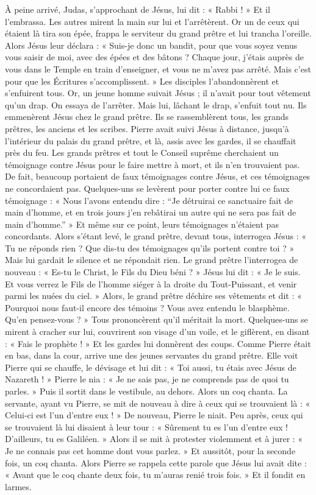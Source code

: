 À peine arrivé, Judas, s’approchant de Jésus, lui dit : « Rabbi ! » Et il l’embrassa.
Les autres mirent la main sur lui et l’arrêtèrent.
Or un de ceux qui étaient là tira son épée, frappa le serviteur du grand prêtre et lui trancha l’oreille.
Alors Jésus leur déclara : « Suis-je donc un bandit, pour que vous soyez venus vous saisir de moi, avec des épées et des bâtons ?
Chaque jour, j’étais auprès de vous dans le Temple en train d’enseigner, et vous ne m’avez pas arrêté. Mais c’est pour que les Écritures s’accomplissent. »
Les disciples l’abandonnèrent et s’enfuirent tous.
Or, un jeune homme suivait Jésus ; il n’avait pour tout vêtement qu’un drap. On essaya de l’arrêter.
Mais lui, lâchant le drap, s’enfuit tout nu.
Ils emmenèrent Jésus chez le grand prêtre. Ils se rassemblèrent tous, les grands prêtres, les anciens et les scribes.
Pierre avait suivi Jésus à distance, jusqu’à l’intérieur du palais du grand prêtre, et là, assis avec les gardes, il se chauffait près du feu.
Les grands prêtres et tout le Conseil suprême cherchaient un témoignage contre Jésus pour le faire mettre à mort, et ils n’en trouvaient pas.
De fait, beaucoup portaient de faux témoignages contre Jésus, et ces témoignages ne concordaient pas.
Quelques-uns se levèrent pour porter contre lui ce faux témoignage :
« Nous l’avons entendu dire : “Je détruirai ce sanctuaire fait de main d’homme, et en trois jours j’en rebâtirai un autre qui ne sera pas fait de main d’homme.” »
Et même sur ce point, leurs témoignages n’étaient pas concordants.
Alors s’étant levé, le grand prêtre, devant tous, interrogea Jésus : « Tu ne réponds rien ? Que dis-tu des témoignages qu’ils portent contre toi ? »
Mais lui gardait le silence et ne répondait rien. Le grand prêtre l’interrogea de nouveau : « Es-tu le Christ, le Fils du Dieu béni ? »
Jésus lui dit : « Je le suis. Et vous verrez le Fils de l’homme siéger à la droite du Tout-Puissant, et venir parmi les nuées du ciel. »
Alors, le grand prêtre déchire ses vêtements et dit : « Pourquoi nous faut-il encore des témoins ?
Vous avez entendu le blasphème. Qu’en pensez-vous ? » Tous prononcèrent qu’il méritait la mort.
Quelques-uns se mirent à cracher sur lui, couvrirent son visage d’un voile, et le giflèrent, en disant : « Fais le prophète ! » Et les gardes lui donnèrent des coups.
Comme Pierre était en bas, dans la cour, arrive une des jeunes servantes du grand prêtre.
Elle voit Pierre qui se chauffe, le dévisage et lui dit : « Toi aussi, tu étais avec Jésus de Nazareth ! »
Pierre le nia : « Je ne sais pas, je ne comprends pas de quoi tu parles. » Puis il sortit dans le vestibule, au dehors. Alors un coq chanta.
La servante, ayant vu Pierre, se mit de nouveau à dire à ceux qui se trouvaient là : « Celui-ci est l’un d’entre eux ! »
De nouveau, Pierre le niait. Peu après, ceux qui se trouvaient là lui disaient à leur tour : « Sûrement tu es l’un d’entre eux ! D’ailleurs, tu es Galiléen. »
Alors il se mit à protester violemment et à jurer : « Je ne connais pas cet homme dont vous parlez. »
Et aussitôt, pour la seconde fois, un coq chanta. Alors Pierre se rappela cette parole que Jésus lui avait dite : « Avant que le coq chante deux fois, tu m’auras renié trois fois. » Et il fondit en larmes.

